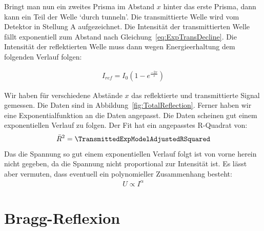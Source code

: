 \documentclass[a4paper,10pt,twocolumn]{article}
\begin{document}
    Bringt man nun ein zweites Prisma im Abstand $x$ hinter das erste Prisma, dann kann ein Teil der Welle
    `durch tunneln'.
    Die transmittierte Welle wird vom Detektor in Stellung A aufgezeichnet.
    Die Intensität der transmittierten Welle fällt exponentiell zum Abstand nach Gleichung~\eqref{eq:ExpTransDecline}.
    Die Intensität der reflektierten Welle muss dann wegen Energieerhaltung dem folgenden Verlauf folgen:
    
    \begin{align*}
        I_{ref} = I_0 (1 - e^{\frac{-2x}{s}})
    \end{align*}
    
    
    Wir haben für verschiedene Abstände $x$ das reflektierte und transmittierte Signal gemessen.
    Die Daten sind in Abbildung~\ref{fig:TotalReflection}.
    Ferner haben wir eine Exponentialfunktion an die Daten angepasst.
    Die Daten scheinen gut einem exponentiellen Verlauf zu folgen.
    Der Fit hat ein angepasstes R-Quadrat von:
    \begin{align*}
        \bar{R}^2 = \TransmittedExpModelAdjustedRSquared
    \end{align*}
    Das die Spannung so gut einem exponentiellen Verlauf folgt ist von vorne herein nicht gegeben, da die
    Spannung nicht proportional zur Intensität ist.
    Es lässt aber vermuten, dass eventuell ein polynomieller Zusammenhang besteht:
    \begin{align*}
        U \propto I^{\alpha}
    \end{align*}
    
    
    \section{Bragg-Reflexion}
%    
    
\end{document}
